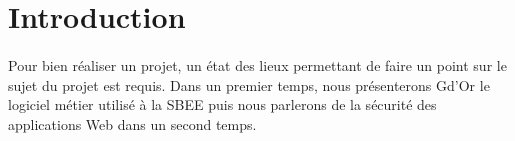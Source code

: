 \section*{Introduction}
	\paragraph{}
      Pour bien réaliser un projet, un état des lieux permettant de faire un point sur le sujet du projet est requis. Dans un premier temps, nous présenterons Gd'Or le logiciel m\'etier utilis\'e \`a la SBEE puis nous parlerons de la s\'ecurit\'e des applications Web dans un second temps.